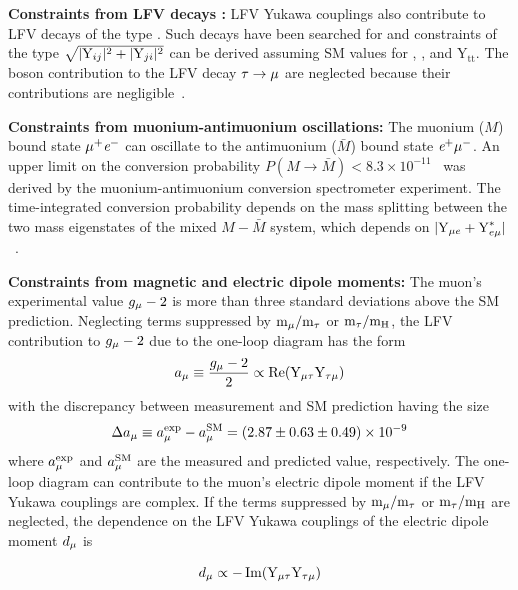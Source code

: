\textbf{Constraints from LFV decays \ltl:} LFV Yukawa couplings also contribute to LFV decays of the type \ltl. Such decays have been searched for and constraints of the type $\sqrt{|\text{Y}_{ij}|^2+|\text{Y}_{ji}|^2}$ can be derived assuming SM values for \Ytt, \Ymm, and $\text{Y}_{\text{tt}}$. The \PZ boson contribution to the LFV decay $\tau \to \mu$ are neglected because their contributions are negligible~\cite{Goto:2015iha}.

\textbf{Constraints from muonium-antimuonium oscillations:} The muonium ($M$) bound state $\mu^{+} \textit{e}^{-}$ can oscillate to the antimuonium ($\bar{M}$) bound state $\textit{e}^{+} \mu^{-}$. An upper limit on the conversion probability $P(M \to \bar{M}) < 8.3 \times 10^{-11}$~\cite{Willmann:1998gd} was derived by the muonium-antimuonium conversion spectrometer experiment. The time-integrated conversion probability depends on the mass splitting between the two mass eigenstates of the mixed $M-\bar{M}$ system, which depends on $|\text{Y}_{\mu e}+\text{Y}_{e \mu}^{*}|$~\cite{Harnik:2012pb}.

\textbf{Constraints from magnetic and electric dipole moments:} The muon's experimental value $g_{\mu}-2$ is more than three standard deviations above the SM prediction. Neglecting terms suppressed by $\text{m}_{\mu} / \text{m}_{\tau}$ or $\text{m}_{\tau} / \text{m}_\text{H}$, the LFV contribution to $g_{\mu}-2$ due to the one-loop diagram has the form
%
\begin{equation}
  a_{\mu} \equiv \frac{g_{\mu}-2}{2} \propto \operatorname{Re}(\text{Y}_{\mu\tau} \text{Y}_{\tau\mu})
\end{equation}
%
with the discrepancy between measurement and SM prediction having the size
%
\begin{equation}
  \Delta a_{\mu} \equiv a_{\mu}^{\text{exp}}-a_{\mu}^{\text{SM}}=(2.87 \pm 0.63 \pm 0.49) \times 10^{-9}
\end{equation}
%
where $a_{\mu}^{\text{exp}}$ and $a_{\mu}^{\text{SM}}$ are the measured and predicted value, respectively. The one-loop diagram can contribute to the muon's electric dipole moment if the LFV Yukawa couplings are complex. If the terms suppressed by $\text{m}_{\mu} / \text{m}_{\tau}$ or $\text{m}_{\tau} / \text{m}_\text{H}$ are neglected, the dependence on the LFV Yukawa couplings of the electric dipole moment $d_{\mu}$ is

\begin{equation}
  d_{\mu} \propto-\operatorname{Im}(\text{Y}_{\mu\tau} \text{Y}_{\tau\mu})
\end{equation}

